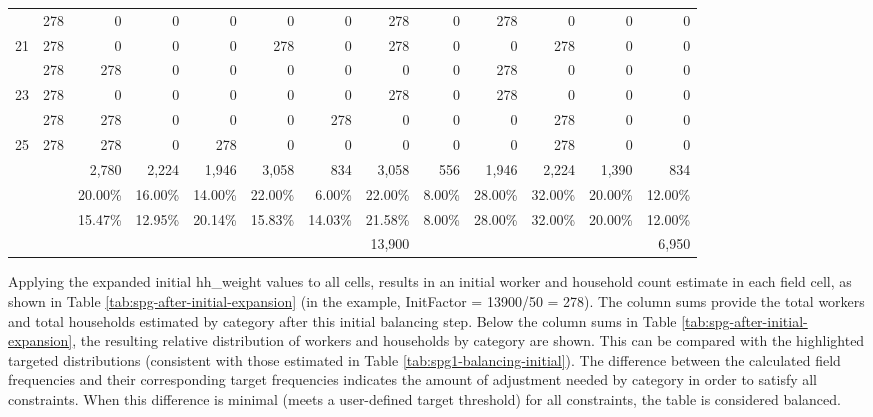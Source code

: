 \begin{sidewaystable}
\begin{tabular}{c*{12}{r}}
\gray 20 & 278 & 0 & 0 & 0 & 0 & 0 & 278 & 0 & 278 & 0 & 0 & 0 \\
21 & 278 & 0 & 0 & 0 & 278 & 0 & 278 & 0 & 0 & 278 & 0 & 0 \\
\gray 22 & 278 & 278 & 0 & 0 & 0 & 0 & 0 & 0 & 278 & 0 & 0 & 0 \\
23 & 278 & 0 & 0 & 0 & 0 & 0 & 278 & 0 & 278 & 0 & 0 & 0 \\
\gray 24 & 278 & 278 & 0 & 0 & 0 & 278 & 0 & 0 & 0 & 278 & 0 & 0 \\
25 & 278 & 278 & 0 & 278 & 0 & 0 & 0 & 0 & 0 & 278 & 0 & 0 \\
\hline
 &  & 2,780 & 2,224 & 1,946 & 3,058 & 834 & 3,058 & 556 & 1,946 & 2,224 & 1,390 & 834 \\
 &  & 20.00\% & 16.00\% & 14.00\% & 22.00\% & 6.00\% & 22.00\% & 8.00\% & 28.00\% & 32.00\% & 20.00\% & 12.00\% \\
\rowcolor{yellow!10} \cellcolor{white}& \cellcolor{white} & 15.47\% & 12.95\% & 20.14\% & 15.83\% & 14.03\% & 21.58\% & 8.00\% & 28.00\% & 32.00\% & 20.00\% & 12.00\% \\
 &  &  &  &  &  &  & 13,900 &  &  &  &  & 6,950 \\
\hline
\end{tabular}
\end{sidewaystable}

Applying the expanded initial hh\_weight values to all cells, results in an initial worker and household count estimate in each field cell, as shown in Table \ref{tab:spg-after-initial-expansion} (in the example, InitFactor = 13900/50 = 278). The column sums provide the total workers and total households estimated by category after this initial balancing step. Below the column sums in Table \ref{tab:spg-after-initial-expansion}, the resulting relative distribution of workers and households by category are shown. This can be compared with the highlighted targeted distributions (consistent with those estimated in Table \ref{tab:spg1-balancing-initial}). The difference between the calculated field frequencies and their corresponding target frequencies indicates the amount of adjustment needed by category in order to satisfy all constraints. When this difference is minimal (meets a user-defined target threshold) for all constraints, the table is considered balanced.

